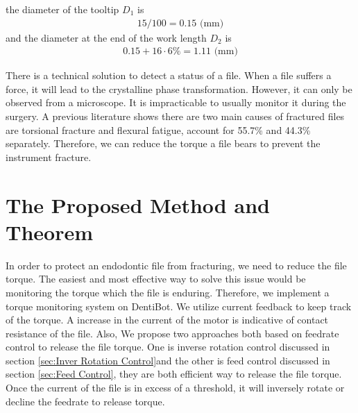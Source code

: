 the diameter of the tooltip $D_1$ is
\begin{equation*}
\begin{split}
15/100=0.15 \text{ (mm)}
\end{split}
\end{equation*}
and the diameter at the end of the work length $D_2$ is
\begin{equation*}
\begin{split}
0.15 + 16 \cdot 6\% = 1.11 \text{ (mm)}
\end{split}
\end{equation*}
\par
There is a technical solution to detect a status of a file. When a file suffers a force, it will lead to the crystalline phase transformation. However, it can only be observed from a microscope. It is impracticable to usually monitor it during the surgery. A previous literature shows there are two main causes of fractured files are torsional fracture and flexural fatigue, account for 55.7\% and 44.3\% separately\cite{SATTAPAN2000161}. Therefore, we can reduce the torque a file bears to prevent the instrument fracture.
\section{The Proposed Method and Theorem}
\hspace*{6mm}In order to protect an endodontic file from fracturing, we need to reduce the file torque. The easiest and most effective way to solve this issue would be monitoring the torque which the file is enduring. Therefore, we implement a torque monitoring system on DentiBot. We utilize current feedback to keep track of the torque. A increase in the current of the motor is indicative of contact resistance of the file. Also, We propose two approaches both based on feedrate control to release the file torque. One is inverse rotation control discussed in section \ref{sec:Inver Rotation Control}and the other is feed control discussed in section \ref{sec:Feed Control}, they are both efficient way to release the file torque. Once the current of the file is in excess of a threshold, it will inversely rotate or decline the feedrate to release torque. 
